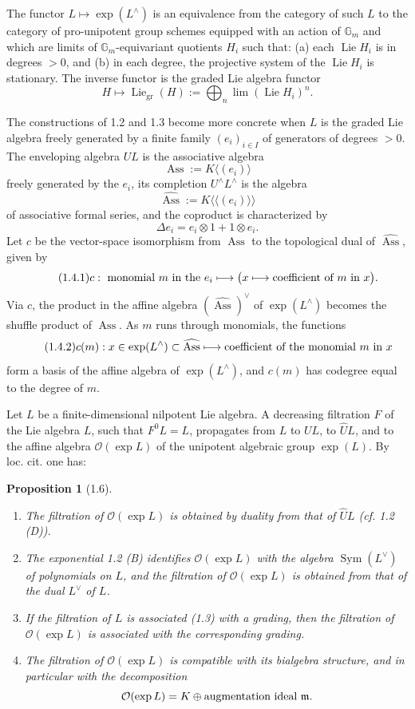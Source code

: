 \documentclass[10pt,a4paper]{article}
\newcommand{\Gm}{\mathbb G_m}
\newcommand{\Sym}{\operatorname{Sym}}
\newcommand{\Lie}{\operatorname{Lie}}
\newcommand{\Ass}{\operatorname{Ass}}
\newcommand{\OO}{\mathcal O}
\newcommand{\m}{\mathfrak m}
\newcommand{\Lhat}{L^{\wedge}}
\newcommand{\Uhat}{U^{\wedge}}
\newcommand{\Liegr}{\operatorname{Lie}_{\mathrm{gr}}}
\theoremstyle{deligne}
\newtheorem*{proposition*}{Proposition}
\newcommand{\heading}[1]{\vspace{0.65em}\noindent{\bfseries #1}\quad}
\begin{document}
The functor \(L\mapsto\exp(\Lhat)\) is an equivalence from the category of such \(L\) to the category of pro-unipotent group schemes equipped with an action of \(\Gm\) and which are limits of \(\Gm\)-equivariant quotients \(H_i\) such that: (a) each \(\Lie H_i\) is in degrees \(>0\), and (b) in each degree, the projective system of the \(\Lie H_i\) is stationary. The inverse functor is the graded Lie algebra functor
\[
H\longmapsto \Liegr(H):=\bigoplus_n\lim (\Lie H_i)^n.
\]

\heading{1.4.} The constructions of 1.2 and 1.3 become more concrete when \(L\) is the graded Lie algebra freely generated by a finite family \((e_i)_{i\in I}\) of generators of degrees \(>0\). The enveloping algebra \(UL\) is the associative algebra
\[
\Ass:=K\langle(e_i)\rangle
\]
freely generated by the \(e_i\), its completion \(\Uhat\Lhat\) is the algebra
\[
\widehat{\Ass}:=K\langle\!\langle(e_i)\rangle\!\rangle
\]
of associative formal series, and the coproduct is characterized by
\[
\Delta e_i=e_i\otimes1+1\otimes e_i.
\]
Let \(c\) be the vector-space isomorphism from \(\Ass\) to the topological dual of \(\widehat{\Ass}\), given by
\[
\tag{1.4.1}
c:\ \hbox{monomial }m\hbox{ in the }e_i\longmapsto
\bigl(x\longmapsto \hbox{coefficient of }m\hbox{ in }x\bigr).
\]
Via \(c\), the product in the affine algebra \((\widehat{\Ass})^\vee\) of \(\exp(\Lhat)\) becomes the shuffle product of \(\Ass\). As \(m\) runs through monomials, the functions
\[
\tag{1.4.2}
c(m):x\in\exp(\Lhat)\subset\widehat{\Ass}\longmapsto
\hbox{coefficient of the monomial }m\hbox{ in }x
\]
form a basis of the affine algebra of \(\exp(\Lhat)\), and \(c(m)\) has codegree equal to the degree of \(m\).

\heading{1.5 (cf. [1] A1 to A3).} Let \(L\) be a finite-dimensional nilpotent Lie algebra. A decreasing filtration \(F\) of the Lie algebra \(L\), such that \(F^0L=L\), propagates from \(L\) to \(UL\), to \(\widehat UL\), and to the affine algebra \(\OO(\exp L)\) of the unipotent algebraic group \(\exp(L)\). By loc. cit. one has:

\begin{proposition*}[1.6]
\begin{enumerate}[label=(\roman*)]
\item The filtration of \(\OO(\exp L)\) is obtained by duality from that of \(\widehat UL\) (cf. 1.2 (D)).
\item The exponential 1.2 (B) identifies \(\OO(\exp L)\) with the algebra \(\Sym(L^\vee)\) of polynomials on \(L\), and the filtration of \(\OO(\exp L)\) is obtained from that of the dual \(L^\vee\) of \(L\).
\item If the filtration of \(L\) is associated (1.3) with a grading, then the filtration of \(\OO(\exp L)\) is associated with the corresponding grading.
\item The filtration of \(\OO(\exp L)\) is compatible with its bialgebra structure, and in particular with the decomposition
\[
\OO(\exp L)=K\oplus \hbox{augmentation ideal }\m.
\]
\end{enumerate}
\end{proposition*}
\end{document}
